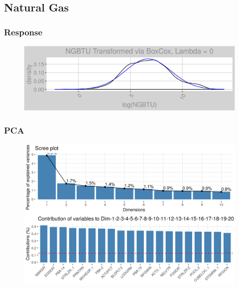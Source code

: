 \subsection{Natural Gas}
\subsubsection{Response}
\label{appendix:natural_gas:response}
\begin{figure}[h]
\centering
\includegraphics[width=\textwidth, height=0.3\textheight]{Images/natural_gas_response.png}
\end{figure}
\subsubsection{PCA}
\label{appendix:natural_gas:pca}
\begin{figure}[h]
\centering
\includegraphics[width=\textwidth, height=0.3\textheight]{Images/natural_gas_pca_vars.png}
\end{figure}
\FloatBarrier
\newpage
